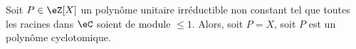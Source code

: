 %
%
%
%

\begin{theorem} \label{ThojCJpFW}
	Soit \( P\in \eZ[X]\) un polynôme unitaire irréductible non constant tel que toutes les racines dans \( \eC\) soient de module \( \leq 1\). Alors, soit \( P=X\), soit \( P\) est un polynôme cyclotomique.
\end{theorem}

